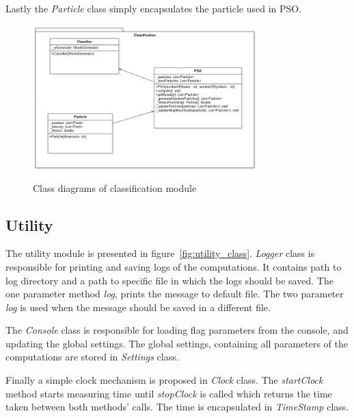 \documentclass{article}
\begin{document}
Lastly the \textit{Particle} class simply encapsulates the particle used in PSO.

%
%
\begin{figure}[H]
	\centering
	\includegraphics[width=0.8\textwidth]{images/classification_class.jpg}
    \caption{Class diagrams of classification module}
    \label{fig:classification_class}
\end{figure}



\newpage
\subsection{Utility}

The utility module is presented in figure~\ref{fig:utility_class}. \textit{Logger} class is responsible for printing and saving logs of the computations. It contains path to log directory and a path to specific file in which the logs should be saved. The one parameter method \textit{log}, prints the message to default file. The two parameter \textit{log} is used when the message should be saved in a different file.

The \textit{Console} class is responsible for loading flag parameters from the console, and updating the global settings. The global settings, containing all parameters of the computations are stored in \textit{Settings} class.

Finally a simple clock mechanism is proposed in \textit{Clock} class. The \textit{startClock} method starts measuring time until \textit{stopClock} is called which returns the time taken between both methods' calls. The time is encapsulated in \textit{TimeStamp} class.
\end{document}
